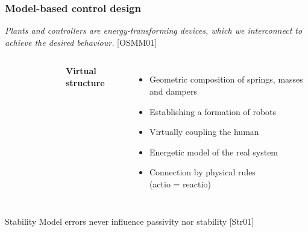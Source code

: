 \documentclass[student]{ITRslides}
\begin{document}
\begin{frame}
	\frametitle{Model-based control design}
	\textit{Plants and controllers are energy-transforming devices, which we interconnect to achieve the desired behaviour.} \nocite{Ortega_01}{\tiny [OSMM01]}
	\vspace{10pt}
		\begin{columns}
			\begin{figure}
			\centering
			\def\svgwidth{1\columnwidth}
			
			\end{figure}
			\textbf{Virtual structure}
			\begin{itemize}
				\item Geometric composition of springs, masses and dampers
				\item Establishing a formation of robots
				\item Virtually coupling the human
				\item Energetic model of the real system
				\item Connection by physical rules \\ (actio = reactio) 
			\end{itemize}
			\end{columns}
								\begin{block}{Stability}
									Model errors never influence passivity nor stability \nocite{Stramigioli_01}{\tiny [Str01]} 
								\end{block}

\end{frame}
\end{document}
